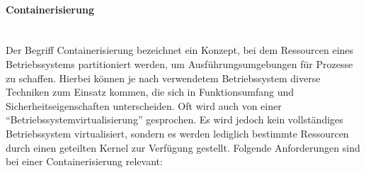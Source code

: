 \paragraph{Containerisierung}
\noindent \\Der Begriff Containerisierung bezeichnet ein Konzept, bei dem Ressourcen eines Betriebssystems partitioniert werden, um Ausf\"uhrungsumgebungen f\"ur Prozesse zu schaffen. Hierbei k\"onnen je nach verwendetem Betriebssystem diverse Techniken zum Einsatz kommen, die sich in Funktionsumfang und Sicherheitseigenschaften unterscheiden. Oft wird auch von einer "`Betriebssystemvirtualisierung"' gesprochen. Es wird jedoch kein vollst\"andiges Betriebssystem
virtualisiert, sondern es werden lediglich bestimmte Ressourcen durch einen geteilten Kernel zur Verf\"ugung gestellt. Folgende Anforderungen sind bei einer Containerisierung relevant:

